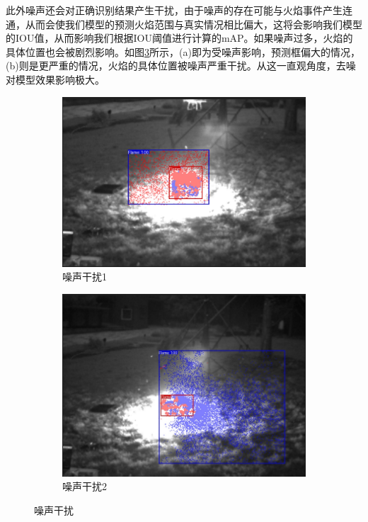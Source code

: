 此外噪声还会对正确识别结果产生干扰，由于噪声的存在可能与火焰事件产生连通，从而会使我们模型的预测火焰范围与真实情况相比偏大，这将会影响我们模型的IOU值，从而影响我们根据IOU阈值进行计算的mAP。如果噪声过多，火焰的具体位置也会被剧烈影响。如图\ref{24}所示，(a)即为受噪声影响，预测框偏大的情况，(b)则是更严重的情况，火焰的具体位置被噪声严重干扰。从这一直观角度，去噪对模型效果影响极大。
\begin{figure}[ht]
    \centering
    \begin{subfigure}{0.49\textwidth}
        \centering
        \includegraphics[width=\textwidth]{figures/zaoshen1.png}
        \caption{噪声干扰1}
        \label{24.a}
    \end{subfigure}
    \hfill
    \begin{subfigure}{0.49\textwidth}
        \centering
        \includegraphics[width=\textwidth]{figures/zaosheng2.png}
        \caption{噪声干扰2}
        \label{24.b}
    \end{subfigure}
    \caption{噪声干扰}
    \label{24}
\end{figure}


